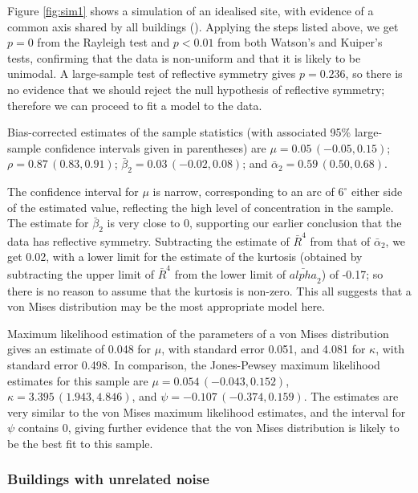 \documentclass[../../ArchStats.tex]{subfiles}
\begin{document}
Figure \ref{fig:sim1} shows a simulation of an idealised site, with evidence of a common axis shared by all buildings (). Applying the steps listed above, we get $p = 0$ from the Rayleigh test and $p < 0.01$ from both Watson's and Kuiper's tests, confirming that the data is non-uniform and that it is likely to be unimodal. A large-sample test of reflective symmetry gives  $p=0.236$, so there is no evidence that we should reject the null hypothesis of reflective symmetry; therefore we can proceed to fit a model to the data.

Bias-corrected estimates of the sample statistics (with associated 95\% large-sample confidence intervals given in parentheses) are $\mu = 0.05 \, (-0.05, 0.15)$; $\rho = 0.87 \, (0.83, 0.91)$; $\bar{\beta}_2 = 0.03 \, (-0.02, 0.08)$; and $\bar{\alpha}_2 = 0.59 \, (0.50,  0.68)$. 

The confidence interval for $\mu$ is narrow, corresponding to an arc of $6^\circ$ either side of the estimated value, reflecting the high level of concentration in the sample. The estimate for $\bar{\beta}_2$ is very close to 0, supporting our earlier conclusion that the data has reflective symmetry. Subtracting the estimate of $\bar{R}^4$ from that of $\bar{\alpha}_2$, we get 0.02, with a lower limit for the estimate of the kurtosis (obtained by subtracting the upper limit of $\bar{R}^4$ from the lower limit of $\bar{alpha}_2$) of -0.17; so there is no reason to assume that the kurtosis is non-zero. This all suggests that a von Mises distribution may be the most appropriate model here.

Maximum likelihood estimation of the parameters of a von Mises distribution gives an estimate of 0.048 for $\mu$, with standard error 0.051, and 4.081 for $\kappa$, with standard error 0.498. In comparison, the Jones-Pewsey maximum likelihood estimates for this sample are $\mu = 0.054 \,(-0.043, 0.152)$, $\kappa = 3.395 \,(1.943, 4.846)$, and $\psi = -0.107 \,(-0.374, 0.159)$. The estimates are very similar to the von Mises maximum likelihood estimates, and the interval for $\psi$ contains 0, giving further evidence that the von Mises distribution is likely to be the best fit to this sample.


\subsubsection{Buildings with unrelated noise}

\end{document}

